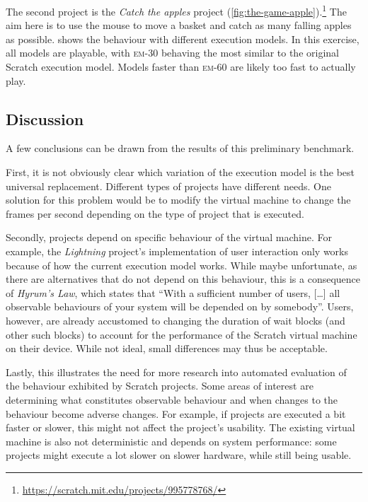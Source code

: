 \documentclass[../main]{subfiles}
\begin{document}
The second project is the \textit{Catch the apples} project (\cref{fig:the-game-apple}).\footnote{\url{https://scratch.mit.edu/projects/995778768/}}
The aim here is to use the mouse to move a basket and catch as many falling apples as possible.
 shows the behaviour with different execution models.
In this exercise, all models are playable, with \textsc{em-30} behaving the most similar to the original Scratch execution model.
Models faster than \textsc{em-60} are likely too fast to actually play.

\subsection{Discussion}\label{subsec:discussion}

A few conclusions can be drawn from the results of this preliminary benchmark.

First, it is not obviously clear which variation of the execution model is the best universal replacement.
Different types of projects have different needs.
One solution for this problem would be to modify the virtual machine to change the frames per second depending on the type of project that is executed.

Secondly, projects depend on specific behaviour of the virtual machine.
For example, the \textit{Lightning} project's implementation of user interaction only works because of how the current execution model works.
While maybe unfortunate, as there are alternatives that do not depend on this behaviour, this is a consequence of \textit{Hyrum's Law}, which states that ``With a sufficient number of users, [\dots] all observable behaviours of your system will be depended on by somebody''.
Users, however, are already accustomed to changing the duration of wait blocks (and other such blocks) to account for the performance of the Scratch virtual machine on their device.
While not ideal, small differences may thus be acceptable.

Lastly, this illustrates the need for more research into automated evaluation of the behaviour exhibited by Scratch projects.
Some areas of interest are determining what constitutes observable behaviour and when changes to the behaviour become adverse changes.
For example, if projects are executed a bit faster or slower, this might not affect the project's usability.
The existing virtual machine is also not deterministic and depends on system performance: some projects might execute a lot slower on slower hardware, while still being usable.
\end{document}
